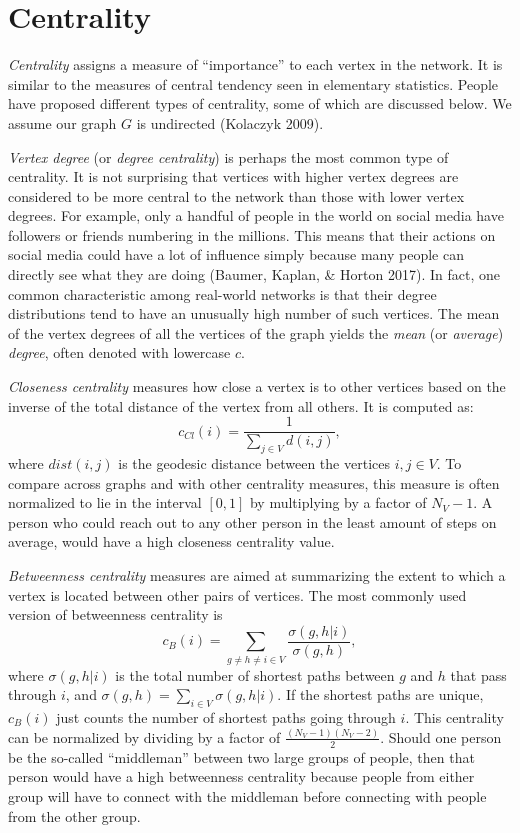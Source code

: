 \documentclass[12pt,twoside]{amherstthesis}
\begin{document}
  \section{Centrality}\label{centrality}
  
  \emph{Centrality} assigns a measure of ``importance'' to each vertex in
  the network. It is similar to the measures of central tendency seen in
  elementary statistics. People have proposed different types of
  centrality, some of which are discussed below. We assume our graph \(G\)
  is undirected (Kolaczyk 2009).
  
  \emph{Vertex degree} (or \emph{degree centrality}) is perhaps the most
  common type of centrality. It is not surprising that vertices with
  higher vertex degrees are considered to be more central to the network
  than those with lower vertex degrees. For example, only a handful of
  people in the world on social media have followers or friends numbering
  in the millions. This means that their actions on social media could
  have a lot of influence simply because many people can directly see what
  they are doing (Baumer, Kaplan, \& Horton 2017). In fact, one common
  characteristic among real-world networks is that their degree
  distributions tend to have an unusually high number of such vertices.
  The mean of the vertex degrees of all the vertices of the graph yields
  the \emph{mean} (or \emph{average}) \emph{degree}, often denoted with
  lowercase \(c\).
  
  \emph{Closeness centrality} measures how close a vertex is to other
  vertices based on the inverse of the total distance of the vertex from
  all others. It is computed as:
  \[c_{Cl}(i) = \frac {1} {\sum_{j \in V}^{} d(i, j)},\] where
  \(dist(i,j)\) is the geodesic distance between the vertices
  \(i,j \in V\). To compare across graphs and with other centrality
  measures, this measure is often normalized to lie in the interval
  \([0,1]\) by multiplying by a factor of \(N_{V} - 1\). A person who
  could reach out to any other person in the least amount of steps on
  average, would have a high closeness centrality value.
  
  \emph{Betweenness centrality} measures are aimed at summarizing the
  extent to which a vertex is located between other pairs of vertices. The
  most commonly used version of betweenness centrality is
  \[c_{B}(i) = \sum_{g \neq h \neq i \in V}^{} \frac {\sigma(g,h|i)} {\sigma(g,h)},\]
  where \(\sigma(g,h|i)\) is the total number of shortest paths between
  \(g\) and \(h\) that pass through \(i\), and
  \(\sigma(g,h) = \sum_{i \in V}^{} \sigma(g,h|i)\). If the shortest paths
  are unique, \(c_{B}(i)\) just counts the number of shortest paths going
  through \(i\). This centrality can be normalized by dividing by a factor
  of \(\frac {(N_V - 1)(N_V - 2)} {2}\). Should one person be the
  so-called ``middleman'' between two large groups of people, then that
  person would have a high betweenness centrality because people from
  either group will have to connect with the middleman before connecting
  with people from the other group.
  
\end{document}
